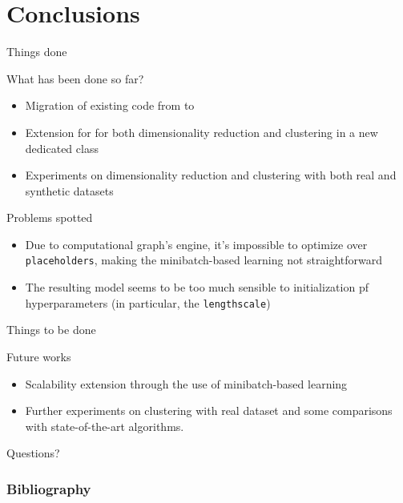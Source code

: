 \section{Conclusions}


\begin{frame}[allowframebreaks]{Things done}
  \begin{exampleblock}{What has been done so far?}
    \begin{itemize}
        \item Migration of existing code from  to 
        \item Extension for \dgplvm for both dimensionality reduction and clustering in a new dedicated class
        \item Experiments on dimensionality reduction and clustering with both real and synthetic datasets
    \end{itemize}
  \end{exampleblock}

  \begin{alertblock}{Problems spotted}
    \begin{itemize}
        \item Due to \tensorflow computational graph's engine, it's impossible to optimize over \texttt{placeholders}, making the minibatch-based learning not straightforward
        \item The resulting model seems to be too much sensible to initialization pf hyperparameters (in particular, the \texttt{lengthscale})
    \end{itemize}
  \end{alertblock}
\end{frame}

\begin{frame}{Things to be done}
    \begin{alertblock}{Future works}
     	\begin{itemize}
     	    \item Scalability extension through the use of minibatch-based learning
            \item Further experiments on clustering with real dataset and some comparisons with state-of-the-art algorithms.
      	\end{itemize}
    \end{alertblock}
\end{frame}

\begin{frame}[standout]
  \huge Questions? 
\end{frame}


\begin{frame}[allowframebreaks] %

\frametitle{Bibliography}
\tiny
\scriptsize{}
\scriptsize
\nocite{*}
\end{frame}
